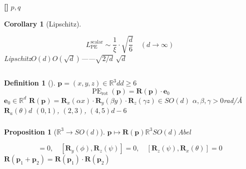 \documentclass[11pt,a4paper]{article}
\newtheorem{proposition}[theorem]{Proposition}
\newtheorem{corollary}[theorem]{Corollary}
\newtheorem{definition}[theorem]{Definition}
\theoremstyle{remark}
\DeclareMathOperator{\PE}{PE}
\newcommand{\R}{\mathbb{R}}
\newcommand{\rigorous}{\textnormal{\textbf{[]}}}
\begin{document}
\rigorous{} \textbf{}$p, q$


\begin{corollary}[Lipschitz]
\label{cor:1.2.3}

\begin{equation}
    L_{\PE}^{\text{scalar}} \sim \frac{1}{\xi} \cdot \sqrt{\frac{d}{6}} \quad (d \to \infty)
\end{equation}
Lipschitz$O(d)$$O(\sqrt{d})$——$\sqrt{2/d}$
$\sqrt{d}$\textbf{}
\end{corollary}

\subsection{}

\subsubsection{}

\begin{definition}[]
\label{def:1.3.1}
$\mathbf{p} = (x, y, z) \in \R^3$$d$$d \geq 6$
\begin{equation}
    \boxed{
    \PE_{\text{rot}}(\mathbf{p}) = \mathbf{R}(\mathbf{p}) \cdot \mathbf{e}_0
    }
\end{equation}
$\mathbf{e}_0 \in \R^d$
$\mathbf{R}(\mathbf{p}) = \mathbf{R}_x(\alpha x) \cdot \mathbf{R}_y(\beta y) \cdot \mathbf{R}_z(\gamma z) \in SO(d)$
$\alpha, \beta, \gamma > 0$\textbf{}rad/\AA{}
$\mathbf{R}_a(\theta)$$d$
$(0,1)$, $(2,3)$, $(4,5)$$d-6$
\end{definition}

\subsubsection{}

\begin{proposition}[$\R^3 \to SO(d)$]
\label{prop:1.3.1}
$\mathbf{p} \mapsto \mathbf{R}(\mathbf{p})$$\R^3$$SO(d)$Abel
\textbf{}
\end{proposition}


\begin{equation}
    [\mathbf{R}_x(\theta), \mathbf{R}_y(\phi)] = 0,\quad
    [\mathbf{R}_y(\phi), \mathbf{R}_z(\psi)] = 0,\quad
    [\mathbf{R}_z(\psi), \mathbf{R}_x(\theta)] = 0
\end{equation}
$\mathbf{R}(\mathbf{p}_1 + \mathbf{p}_2) = \mathbf{R}(\mathbf{p}_1) \cdot \mathbf{R}(\mathbf{p}_2)$
\end{document}

